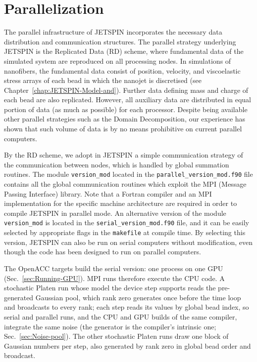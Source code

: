 
\section{Parallelization\label{sec:Parallelization}}

The parallel infrastructure of JETSPIN incorporates the necessary
data distribution and communication structures. The parallel strategy
underlying JETSPIN is the Replicated Data (RD) scheme\cite{smith1991molecular},
where fundamental data of the simulated system are reproduced on all
processing nodes. In simulations of nanofibers, the fundamental data
consist of position, velocity, and viscoelastic stress arrays of each
bead in which the nanojet is discretised (see Chapter~\ref{chap:JETSPIN-Model-and}).
Further data defining mass and charge of each bead are also replicated.
However, all auxiliary data are distributed in equal portion of data
(as much as possible) for each processor. Despite being available
other parallel strategies such as the Domain Decomposition\cite{brown1993domain},
our experience has shown that such volume of data is by no means prohibitive
on current parallel computers.

By the RD scheme, we adopt in JETSPIN a simple communication strategy
of the communication between nodes, which is handled by global summation
routines. The module \texttt{version\_mod} located in the \texttt{parallel\_version\_mod.f90}
file contains all the global communication routines which exploit
the MPI (Message Passing Interface) library. Note that a Fortran
compiler and an MPI implementation for the specific machine architecture
are required in order to compile JETSPIN in parallel mode. An alternative
version of the module \texttt{version\_mod} is located in the \texttt{serial\_version\_mod.f90}
file, and it can be easily selected by appropriate flags in the \texttt{makefile}
at compile time. By selecting this version, JETSPIN can also be run
on serial computers without modification, even though the code has
been designed to run on parallel computers.

The OpenACC targets build the serial version: one process on one GPU
(Sec.~\ref{sec:Running-GPU}). MPI runs therefore execute the CPU code.
A stochastic Platen run whose model the device step supports reads the
pre-generated Gaussian pool, which rank zero generates once before the time
loop and broadcasts to every rank; each step reads its values by global
bead index, so serial and parallel runs, and the CPU and GPU builds of
the same compiler, integrate the same noise (the generator is the
compiler's intrinsic one; Sec.~\ref{sec:Noise-pool}). The other stochastic Platen runs draw one
block of Gaussian numbers per step, also generated by rank zero in global
bead order and broadcast.

